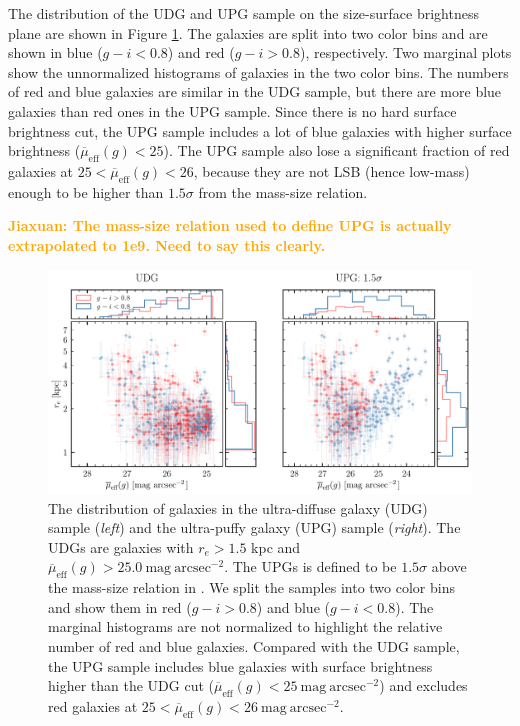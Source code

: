 \documentclass[twocolumn,astrosymb,twocolappendix]{aastex631}
\newcommand{\sbunit}{\mathrm{mag\ arcsec}^{-2}}
\newcommand{\sbeff}{\overline{\mu}_{\mathrm{eff}}(g)}
\newcommand{\jiaxuan}[1]{\textcolor{orange}{\textbf{Jiaxuan: #1}}}
\begin{document}
\begin{CJK*}{UTF8}{gbsn}
The distribution of the UDG and UPG sample on the size-surface brightness plane are shown in Figure \ref{fig:udg_upg_re_mu}. The galaxies are split into two color bins and are shown in blue ($g-i < 0.8$) and red ($g-i > 0.8$), respectively. Two marginal plots show the unnormalized histograms of galaxies in the two color bins. The numbers of red and blue galaxies are similar in the UDG sample, but there are more blue galaxies than red ones in the UPG sample. Since there is no hard surface brightness cut, the UPG sample includes a lot of blue galaxies with higher surface brightness ($\sbeff < 25$). The UPG sample also lose a significant fraction of red galaxies at $25 < \sbeff < 26$, because they are not LSB (hence low-mass) enough to be higher than $1.5\sigma$ from the mass-size relation.

\jiaxuan{The mass-size relation used to define UPG is actually extrapolated to 1e9. Need to say this clearly.}

\begin{figure}
	\vbox{ 
		\centering
		\includegraphics[width=1\linewidth]{udg_upg_sample.pdf}
	}
    \caption{The distribution of galaxies in the ultra-diffuse galaxy (UDG) sample (\textit{left}) and the ultra-puffy galaxy (UPG) sample (\textit{right}). The UDGs are galaxies with $r_e>1.5$ kpc and $\sbeff > 25.0\ \sbunit$. The UPGs is defined to be $1.5\sigma$ above the mass-size relation in \citet{ELVES-I}. We split the samples into two color bins and show them in red ($g-i>0.8$) and blue ($g-i<0.8$). The marginal histograms are not normalized to highlight the relative number of red and blue galaxies. Compared with the UDG sample, the UPG sample includes blue galaxies with surface brightness higher than the UDG cut ($\sbeff < 25\ \sbunit$) and excludes red galaxies at $25 < \sbeff < 26\ \sbunit$.
    }
    \label{fig:udg_upg_re_mu}
\end{figure}


\end{CJK*}
\end{document}
